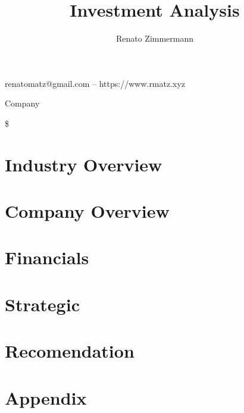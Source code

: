 \documentclass{article}
\makeatletter
\renewcommand{\maketitle}{
\hspace{-.4cm}\begin{minipage}[t]{.6\textwidth}
{\huge\bfseries\thetitle}

\vspace{.1cm}{\large\itshape\theauthor}

renatomatz@gmail.com -- https://www.rmatz.xyz

\end{minipage}
\hfill\vline\hfill
\begin{minipage}[t]{.3\textwidth}
{\Large\company}

\vspace{.1cm}{\large\bfseries\ticker}

\$
\end{minipage}
\vspace{.5cm}
\hline\hline
}
\newcommand{\company}{Company}
\newcommand{\ticker}{TKR}
\makeatother
\begin{document}
\title{Investment Analysis}
\author{Renato Zimmermann}

\maketitle

\section{Industry Overview}

\section{Company Overview}

\section{Financials}

\section{Strategic}

\section{Recomendation}

\pagebreak
\section{Appendix}
\end{document}
